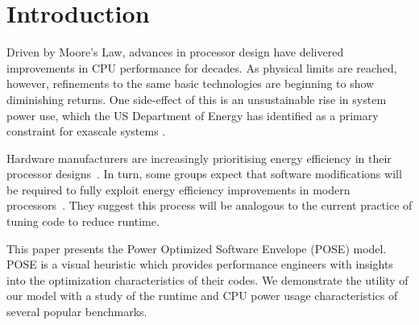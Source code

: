 \section{Introduction}
Driven by Moore's Law, advances in processor design have delivered improvements in CPU performance for decades. As physical limits are reached, however, refinements to the same basic technologies are beginning to show diminishing returns. One side-effect of this is an unsustainable rise in system power use, which the US Department of Energy has identified as a primary constraint for exascale systems \cite{shalf:2011aa}.

Hardware manufacturers are increasingly prioritising energy efficiency in their processor designs~\cite{kurd:2014aa}.
In turn, some groups expect that software modifications will be required to fully exploit energy efficiency improvements in modern processors~\cite{shao:2013aa}.
They suggest this process will be analogous to the current practice of tuning code to reduce runtime.

This paper presents the Power Optimized Software Envelope (POSE) model.
POSE is a visual heuristic which provides performance engineers with insights into the optimization characteristics of their codes.
We demonstrate the utility of our model with a study of the runtime and CPU power usage characteristics of several popular benchmarks.
